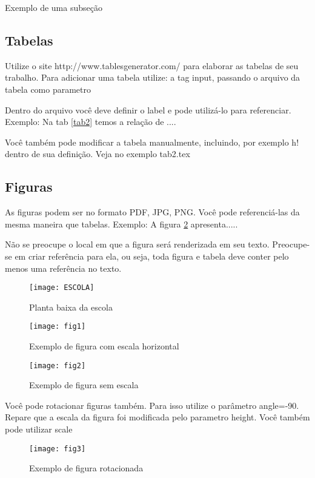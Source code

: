 \documentclass[	DIV=calc,%
							paper=a4,%
							fontsize=12pt,%
							onecolumn]{scrartcl}	 					%
\begin{document}
Exemplo de uma subseção

\subsection{Tabelas}

Utilize o site http://www.tablesgenerator.com/ para elaborar as tabelas de seu trabalho.
Para adicionar uma tabela utilize: a tag input, passando o arquivo da tabela como parametro



Dentro do arquivo você deve definir o label e pode utilizá-lo para referenciar. Exemplo:
Na tab \ref{tab2} temos a relação de ....


Você também pode modificar a tabela manualmente, incluindo, por exemplo h! dentro de sua definição. Veja no exemplo tab2.tex

\subsection{Figuras}

As figuras podem ser no formato PDF, JPG, PNG. Você pode referenciá-las da mesma maneira que tabelas. Exemplo: A figura \ref{fig1} apresenta.....

Não se preocupe o local em que a figura será renderizada em seu texto. Preocupe-se em criar referência para ela, ou seja, toda figura e tabela deve conter pelo menos uma referência no texto.

\begin{figure}
	\centering
	\texttt{[image: ESCOLA]}
	\caption{Planta baixa da escola}
	\label{ESCOLA}
\end{figure}

\begin{figure}
\centering
\texttt{[image: fig1]}
\caption{Exemplo de figura com escala horizontal}
\label{fig1}
\end{figure}


\begin{figure}
	\centering
	\texttt{[image: fig2]}
	\caption{Exemplo de figura sem escala}
	\label{fig2}
\end{figure}

Você pode rotacionar figuras também. Para isso utilize o parâmetro angle=-90. Repare que a escala da figura foi modificada pelo parametro height. Você também pode utilizar scale

\begin{figure}
	\centering
	\texttt{[image: fig3]}
	\caption{Exemplo de figura rotacionada}
	\label{fig3}
\end{figure}


\end{document}
